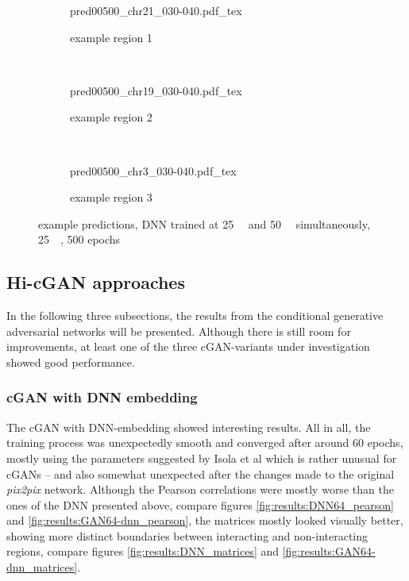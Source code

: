 \begin{figure}[p] %
    \begin{subfigure}{\textwidth}
        \centering
        \scriptsize
        {pred00500_chr21_030-040.pdf_tex}
        \caption{example  region 1} \label{fig:results:25plus50_r1}
    \end{subfigure}\\[6mm]
    \begin{subfigure}{\textwidth}
        \centering
        \scriptsize
        {pred00500_chr19_030-040.pdf_tex}
        \caption{example region 2} \label{fig:results:25plus50_r2}
    \end{subfigure}\\[6mm]
    \begin{subfigure}{\textwidth}
        \centering
        \scriptsize
        {pred00500_chr3_030-040.pdf_tex}
        \caption{example region 3} \label{fig:results:25plus50_r3}
    \end{subfigure}
    \caption{example predictions,  DNN trained at \SI{25}{\kilo\bp} and \SI{50}{\kilo\bp} simultaneously, \SI{25}{\kilo\bp}, 500 epochs}\label{fig:results:25plus50_matrices}
\end{figure}

\clearpage
\subsection{Hi-cGAN approaches} \label{sec:results:cgan}
In the following three subsections, the results from the conditional generative adversarial networks will be presented.
Although there is still room for improvements, at least one of the three cGAN-variants under investigation showed good performance. 

\subsubsection{cGAN with DNN embedding} \label{sec:results:cgan_dnn}
The cGAN with DNN-embedding showed interesting results.
All in all, the training process was unexpectedly smooth and converged after around 60 epochs, mostly using the parameters suggested
by Isola et al \cite{Isola2017} which is rather unusual for cGANs -- and also somewhat unexpected after the changes made to the original
\emph{pix2pix} network. 
Although the Pearson correlations were mostly worse than the ones of the DNN presented above, compare figures \ref{fig:results:DNN64_pearson} and \ref{fig:results:GAN64-dnn_pearson},
the matrices mostly looked visually better, showing more distinct boundaries between interacting and non-interacting regions, compare figures \ref{fig:results:DNN_matrices} and \ref{fig:results:GAN64-dnn_matrices}.

